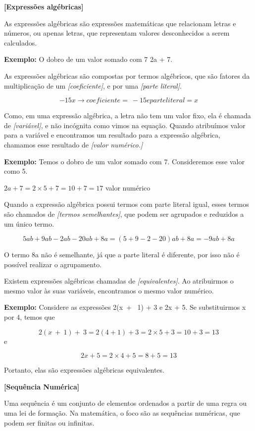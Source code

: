 \textbf{{[}Expressões algébricas{]}}

As expressões algébricas são expressões matemáticas que relacionam
letras e números, ou apenas letras, que representam valores
desconhecidos a serem calculados.

\textbf{Exemplo:} O dobro de um valor somado com 7
\rightarrow 2a + 7.

As expressões algébricas são compostas por termos algébricos, que são
fatores da multiplicação de um \emph{{[}coeficiente{]}}, e por uma
\emph{{[}parte literal{]}}.

$$- 15x \rightarrow coeficiente = \  - 15 e parte literal = x$$

Como, em uma expressão algébrica, a letra não tem um valor fixo, ela é
chamada de \emph{{[}variável{]}}, e não incógnita como vimos na equação.
Quando atribuímos valor para a variável e encontramos um resultado para
a expressão algébrica, chamamos esse resultado de \emph{{[}valor
numérico.{]}}

\textbf{Exemplo:} Temos o dobro de um valor somado com 7. Consideremos
esse valor como 5.

$2a + 7 = 2 \times 5 + 7 = 10 + 7 = 17$ \leftarrow valor numérico

Quando a expressão algébrica possui termos com parte literal igual,
esses termos são chamados de \emph{{[}termos semelhantes{]}}, que podem
ser agrupados e reduzidos a um único termo.

$$5ab + 9ab - 2ab - 20ab + 8a = (5 + 9 - 2 - 20) ab + 8a = - 9ab + 8a$$

O termo 8a não é semelhante, já que a parte literal é diferente, por
isso não é possível realizar o agrupamento.

Existem expressões algébricas chamadas de \emph{{[}equivalentes{]}}. Ao
atribuirmos o mesmo valor às suas variáveis, encontramos o mesmo valor
numérico.

\textbf{Exemplo:} Considere as expressões 2(x\  + \ 1) + 3 e
2x + 5. Se substituirmos x por 4, temos que

$$2\left( x\  + \ 1 \right) + \ 3 = 2\left( 4 + 1 \right) + 3 = 2 \times 5 + 3 = 10 + 3 = 13$$
e 

$$2x + 5 = 2 \times 4 + 5 = 8 + 5 = 13$$ 

Portanto, elas são
expressões algébricas equivalentes.

\textbf{{[}Sequência Numérica{]}}

Uma sequência é um conjunto de elementos ordenados a partir de uma regra
ou uma lei de formação. Na matemática, o foco são as sequências
numéricas, que podem ser finitas ou infinitas.

